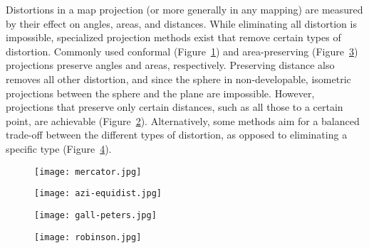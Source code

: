 Distortions in a map projection (or more generally in any mapping) are measured by their effect on angles, areas, and distances.
While eliminating all distortion is impossible, specialized projection methods exist that remove certain types of distortion.
Commonly used conformal (Figure~\ref{fig:mercator}) and area-preserving (Figure~\ref{fig:gall-peters}) projections preserve angles and areas, respectively.
Preserving distance also removes all other distortion, and since the sphere in non-developable, isometric projections between the sphere and the plane are impossible.
However, projections that preserve only certain distances, such as all those to a certain point, are achievable (Figure~\ref{fig:azi-equidist}).
Alternatively, some methods aim for a balanced trade-off between the different types of distortion, as opposed to eliminating a specific type (Figure~\ref{fig:robinson}).


\begin{figure*}[p]
	\centering
	\begin{subfigure}[]{0.5\textwidth}
		\centering
		\texttt{[image: mercator.jpg]}
		\caption{}
		\label{fig:mercator}
	\end{subfigure}%
	\begin{subfigure}[]{0.5\textwidth}
		\centering
		\texttt{[image: azi-equidist.jpg]}
		\caption{}
		\label{fig:azi-equidist}
	\end{subfigure}%
	
	\begin{subfigure}[]{0.5\textwidth}
		\centering
		\texttt{[image: gall-peters.jpg]}
		\caption{}
		\label{fig:gall-peters}
	\end{subfigure}%
	\begin{subfigure}[]{0.5\textwidth}
		\centering
		\texttt{[image: robinson.jpg]}
		\caption{}
		\label{fig:robinson}
	\end{subfigure}
	
	\caption[Four Popular Map Projections]{
		Four common map projections and special properties they possess: \textbf{(a)} Mercator~\cite{mercator}, conformal; \textbf{(b)} azimuthal equidistant~\cite{azi-equidist}, equidistant to centre point; \textbf{(c)} Gall-Peters~\cite{gall-peters}, equal area; and \textbf{(d)} Robinson~\cite{robinson}, compromise (no measures preserved).
		Images courtesy of Daniel R. Strebe -- CC BY-SA 3.0
	}
	\label{fig:projections}
\end{figure*}


